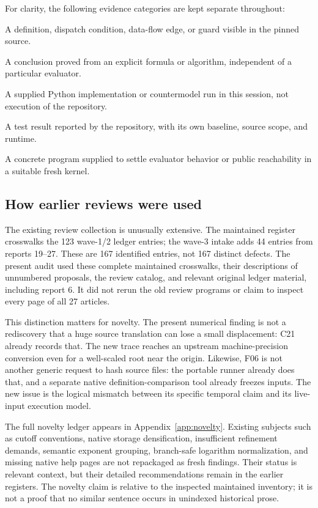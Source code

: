 \documentclass[11pt,letterpaper]{article}
\begin{document}
For clarity, the following evidence categories are kept separate throughout:
\begin{description}[style=nextline]
\item[Source fact] A definition, dispatch condition, data-flow edge, or guard visible in the pinned source.
\item[Mathematical deduction] A conclusion proved from an explicit formula or algorithm, independent of a particular evaluator.
\item[Independent execution] A supplied Python implementation or countermodel run in this session, not execution of the repository.
\item[Repository receipt] A test result reported by the repository, with its own baseline, source scope, and runtime.
\item[Unexecuted characterization] A concrete program supplied to settle evaluator behavior or public reachability in a suitable fresh kernel.
\end{description}

\subsection{How earlier reviews were used}

The existing review collection is unusually extensive. The maintained register crosswalks the 123 wave-1/2 ledger entries; the wave-3 intake adds 44 entries from reports 19--27. These are 167 identified entries, not 167 distinct defects. The present audit used these complete maintained crosswalks, their descriptions of unnumbered proposals, the review catalog, and relevant original ledger material, including report 6. It did not rerun the old review programs or claim to inspect every page of all 27 articles.\cite{review-index,review-status,wave3,review6}

This distinction matters for novelty. The present numerical finding is not a rediscovery that a huge source translation can lose a small displacement: C21 already records that. The new trace reaches an upstream machine-precision conversion even for a well-scaled root near the origin. Likewise, F06 is not another generic request to hash source files: the portable runner already does that, and a separate native definition-comparison tool already freezes inputs. The new issue is the logical mismatch between its specific temporal claim and its live-input execution model.

The full novelty ledger appears in Appendix~\ref{app:novelty}. Existing subjects such as cutoff conventions, native storage densification, insufficient refinement demands, semantic exponent grouping, branch-safe logarithm normalization, and missing native help pages are not repackaged as fresh findings. Their status is relevant context, but their detailed recommendations remain in the earlier registers. The novelty claim is relative to the inspected maintained inventory; it is not a proof that no similar sentence occurs in unindexed historical prose.
\end{document}
